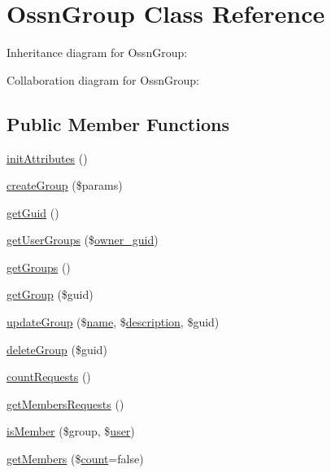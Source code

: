 \hypertarget{class_ossn_group}{}\section{Ossn\+Group Class Reference}
\label{class_ossn_group}


Inheritance diagram for Ossn\+Group\+:


Collaboration diagram for Ossn\+Group\+:
\subsection*{Public Member Functions}
\begin{DoxyCompactItemize}
\item 
\hyperlink{class_ossn_group_a5fee6794de13185987b790fce43d0883}{init\+Attributes} ()
\item 
\hyperlink{class_ossn_group_ac21bd566989fc4f2f730db8e82dd7638}{create\+Group} (\$params)
\item 
\hyperlink{class_ossn_group_a9824fb7fff6b1f348aedade7b39e7b8d}{get\+Guid} ()
\item 
\hyperlink{class_ossn_group_a33283fa2b2cb93939b29b97c8291f3d9}{get\+User\+Groups} (\$\hyperlink{user_8php_a307051fefc937afd02c509c55646f50b}{owner\+\_\+guid})
\item 
\hyperlink{class_ossn_group_a6187b4fda76a8055bd08acafa57d9824}{get\+Groups} ()
\item 
\hyperlink{class_ossn_group_a193aeb5f7bc2e29ea10e58d9b315b796}{get\+Group} (\$guid)
\item 
\hyperlink{class_ossn_group_a9b4ae0e68a46347a9397f4526d84cc65}{update\+Group} (\$\hyperlink{user_8php_a765af5e9671743530143a6d3670fd9a6}{name}, \$\hyperlink{components_2_ossn_wall_2actions_2wall_2post_2edit_8php_a7f60fcaa72b0968e6b6bd7d819fa6fd9}{description}, \$guid)
\item 
\hyperlink{class_ossn_group_ae6756ed2d51292c07c3933a7ad52361e}{delete\+Group} (\$guid)
\item 
\hyperlink{class_ossn_group_a92fafa345b20cf7a1a6c95db8ec85240}{count\+Requests} ()
\item 
\hyperlink{class_ossn_group_a770db4a5eee4b7d8578a46e71ee658fe}{get\+Members\+Requests} ()
\item 
\hyperlink{class_ossn_group_a8b15ce6b022a441d779d09702de1aa38}{is\+Member} (\$group, \$\hyperlink{ossn_8config_8db_8example_8php_a802544b7ba9f79bbf24ef67773d53bed}{user})
\item 
\hyperlink{class_ossn_group_ae1fc6879b40a1a2a837c839e0e637b4e}{get\+Members} (\$\hyperlink{photos_2pages_2photos_8php_a364678aa3bd05301b3d1b8650653cf48}{count}=false)

\end{DoxyCompactItemize}
